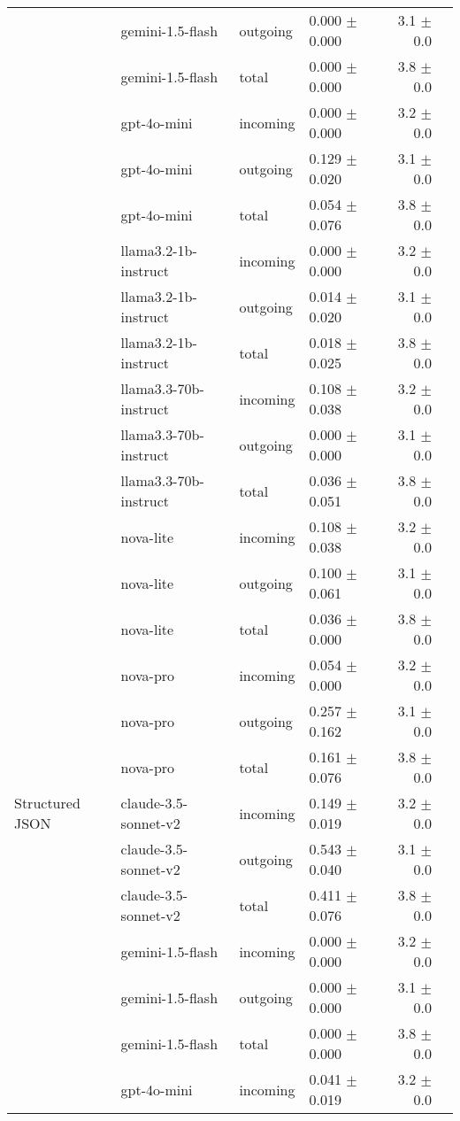 \begin{table}[ht]
\begin{tabular}{llllrr}
 & gemini-1.5-flash & outgoing & 0.000 $\pm$ 0.000 & 3.1 $\pm$ 0.0 \\
 & gemini-1.5-flash & total & 0.000 $\pm$ 0.000 & 3.8 $\pm$ 0.0 \\
 & gpt-4o-mini & incoming & 0.000 $\pm$ 0.000 & 3.2 $\pm$ 0.0 \\
 & gpt-4o-mini & outgoing & 0.129 $\pm$ 0.020 & 3.1 $\pm$ 0.0 \\
 & gpt-4o-mini & total & 0.054 $\pm$ 0.076 & 3.8 $\pm$ 0.0 \\
 & llama3.2-1b-instruct & incoming & 0.000 $\pm$ 0.000 & 3.2 $\pm$ 0.0 \\
 & llama3.2-1b-instruct & outgoing & 0.014 $\pm$ 0.020 & 3.1 $\pm$ 0.0 \\
 & llama3.2-1b-instruct & total & 0.018 $\pm$ 0.025 & 3.8 $\pm$ 0.0 \\
 & llama3.3-70b-instruct & incoming & 0.108 $\pm$ 0.038 & 3.2 $\pm$ 0.0 \\
 & llama3.3-70b-instruct & outgoing & 0.000 $\pm$ 0.000 & 3.1 $\pm$ 0.0 \\
 & llama3.3-70b-instruct & total & 0.036 $\pm$ 0.051 & 3.8 $\pm$ 0.0 \\
 & nova-lite & incoming & 0.108 $\pm$ 0.038 & 3.2 $\pm$ 0.0 \\
 & nova-lite & outgoing & 0.100 $\pm$ 0.061 & 3.1 $\pm$ 0.0 \\
 & nova-lite & total & 0.036 $\pm$ 0.000 & 3.8 $\pm$ 0.0 \\
 & nova-pro & incoming & 0.054 $\pm$ 0.000 & 3.2 $\pm$ 0.0 \\
 & nova-pro & outgoing & 0.257 $\pm$ 0.162 & 3.1 $\pm$ 0.0 \\
 & nova-pro & total & 0.161 $\pm$ 0.076 & 3.8 $\pm$ 0.0 \\
\midrule
Structured JSON & claude-3.5-sonnet-v2 & incoming & 0.149 $\pm$ 0.019 & 3.2 $\pm$ 0.0 \\
 & claude-3.5-sonnet-v2 & outgoing & 0.543 $\pm$ 0.040 & 3.1 $\pm$ 0.0 \\
 & claude-3.5-sonnet-v2 & total & 0.411 $\pm$ 0.076 & 3.8 $\pm$ 0.0 \\
 & gemini-1.5-flash & incoming & 0.000 $\pm$ 0.000 & 3.2 $\pm$ 0.0 \\
 & gemini-1.5-flash & outgoing & 0.000 $\pm$ 0.000 & 3.1 $\pm$ 0.0 \\
 & gemini-1.5-flash & total & 0.000 $\pm$ 0.000 & 3.8 $\pm$ 0.0 \\
 & gpt-4o-mini & incoming & 0.041 $\pm$ 0.019 & 3.2 $\pm$ 0.0 \\

\end{tabular}
\end{table}
